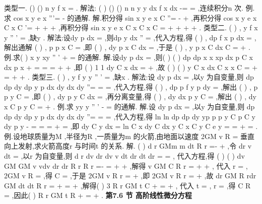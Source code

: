 \textcolor{lyred}{类型一}.
()
()
n
y
f x
=
. 
\textcolor{lyred}{解法}:
(
)
()
()
n
n
y
y
dx
f
x dx
-=
=
\int 
\int 
,连续积分n 次.\textcolor{lyred}{ }
\textcolor{lyred}{例}.求
cos
x
y
e
x
'''=
-
的通解. 
解.积分得
sin
x
y
e
x
C
''=
-
+
,再积分得
cos
x
y
e
x
C x
C
'=
+
+
+
,再积分得 
sin
x
y
e
x
C x
C x
C
=
+
+
+
+
. 
\textcolor{lyred}{类型二}.
(
)
,
y
f x y
''
'
=
,缺y .\textcolor{lyred}{ }
\textcolor{lyred}{解法}:设dy
p
dx =
,则dp
y
dx
''
=
,代入方程,得
(
)
,
dp
f x p
dx =
,解出通解
(
)
,
p
p x C
=
,即 
(
)
,
dy
p x C
dx =
,于是
(
)
,
y
p x C
dx
C
=
+
\int 
. 
\textcolor{lyred}{例}.求(
)
x
y
xy
''
'
+
=
的通解. 
解.设dy
p
dx =
,则(
)
(
)
dp
dp
x
x
xp
dx
p
C
x
dx
p
x
+
=
\Rightarrow 
=
\Rightarrow 
=
+
+
,即 
(
)
1 1
dy
C
x
dx =
+
,故
(
)
(
)
y
C
x
dx
C
x
x
C
=
+
=
+
+
\int 
. 
\textcolor{lyred}{类型三}.
(
)
,
y
f
y y
''
'
=
,缺x .\textcolor{lyred}{ }
\textcolor{lyred}{解法}:设
dy
p
dx
=
,以y 为自变量,则
dp
dp dy
dp
y
p
dx
dy dx
dy
''=
=
\cdots 
=
,代入方程,得 
(
)
,
dp
p
f
y p
dy =
,解出
(
)
,
p
p y C
=
,即
(
)
,
dy
p y C
dx =
,再分离变量,得 
(
)
,
dy
dx
p y C
=
,解出
(
)
,
dy
x
C
p y C
=
+
\int 
. 
\textcolor{lyred}{例}.求
yy
y
''
'
-
=
的通解. 
解.设
dy
p
dx
=
,以y 为自变量,则
dp
dp dy
dp
y
p
dx
dy dx
dy
''=
=
\cdots 
=
,代入方程,得 
ln
ln
dp
dp
dy
yp
p
p
y
C
p
C y
dy
p
y
-
=
\Rightarrow 
=
\Rightarrow 
=
+
\Rightarrow 
=
,即
dy
C y
dx =
\Rightarrow  
ln
C x
dy
C dx
y
C x
C
y
C e
y
=
\Rightarrow 
=
+
\Rightarrow 
=
\int 
\int 
. 
\textcolor{lyred}{例}.设地球质量为M ,半径为R ,一质量为m 的火箭,由地面以速度
2GM
v
R
=
垂直向上发射,求火箭高度r 与时间t 的关系. 
解.
(
)
d r
GMm
m dt
R
r
=-
+
,令
dr
v
dt
=
,以r 为自变量,则
d r
dv dr
dv
v
dt
dr dt
dr
=
\cdots 
=
, 
代入方程,得
(
)
(
)
dv
GM
GM
v
vdv
dr
dr
R
r
R
r
=-
\Rightarrow 
=
+
+
,解得
v
GM
C
R
r
=
+
+
, 
代入
r =
,
2GM
v
R
=
,得
C =
,于是
2GM
v
R
r
=
+
,即
2GM
v
R
r
=
+
,故 
dr
GM
R
rdr
GM dt
dt
R
r
=
\Rightarrow 
+
=
+
,解得(
)
3 R
r
GM t
C
+
=
\cdots +
, 
代入
t =
,
r =
,得
C
R
=
,因此(
)
R
r
GM t
R
+
=
\cdots +
. 
\vspace{6pt}
{\large \bfseries \textcolor{lyred}{第7.6 节 高阶线性微分方程}}

